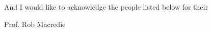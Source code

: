 
\begin{acknowledgements}      


And I would like to acknowledge the people listed below for their

Prof. Rob Macredie

\end{acknowledgements}
